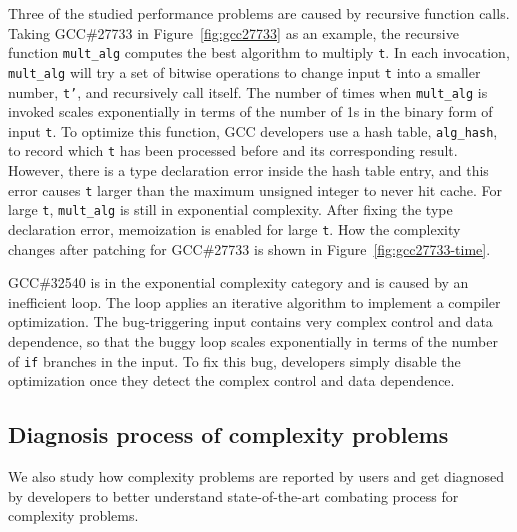 Three of the studied performance problems are caused by recursive function calls. 
Taking GCC\#27733 in Figure~\ref{fig:gcc27733} as an example, 
the recursive function \texttt{mult\_alg} computes the best algorithm to multiply \texttt{t}.
In each invocation, \texttt{mult\_alg} will try a set of bitwise 
operations to change input 
\texttt{t} into a smaller number, \texttt{t'}, 
and recursively call itself.
The number of times when \texttt{mult\_alg} is invoked scales exponentially 
in terms of the number of 1s in the binary form of input \texttt{t}.
To optimize this function, 
GCC developers use a hash table, \texttt{alg\_hash}, to record
which \texttt{t} has been processed before and its corresponding result.
However, there is a type declaration error inside the hash table entry,
and this error causes \texttt{t} larger than the maximum unsigned integer to never hit cache.
For large \texttt{t}, \texttt{mult\_alg} is still in exponential complexity. 
After fixing the type declaration error, 
memoization is enabled for large \texttt{t}. 
How the complexity changes after patching for GCC\#27733 is shown in Figure~\ref{fig:gcc27733-time}.

GCC\#32540 is in the exponential complexity category and is caused by an inefficient loop. 
The loop applies an iterative algorithm to implement a compiler optimization. 
The bug-triggering input contains very complex control and data dependence,  
so that the buggy loop scales exponentially in terms of the number 
of \texttt{if} branches in the input. 
To fix this bug, developers simply disable the optimization 
once they detect the complex control and data dependence.  


\subsection{Diagnosis process of complexity problems}
\label{sec:process}

We also study how complexity problems are reported by users 
and get diagnosed by developers 
to better understand state-of-the-art combating process for complexity problems. 

